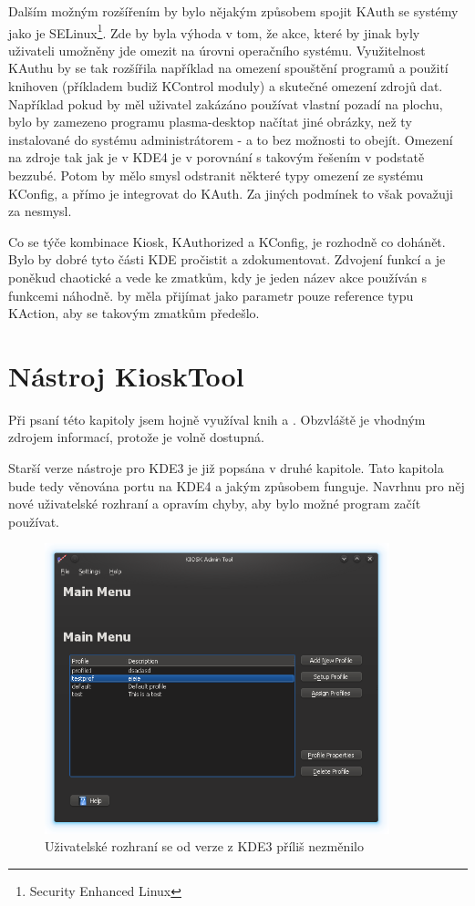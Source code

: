 Dalším možným rozšířením by bylo nějakým způsobem spojit KAuth se systémy jako je SELinux\footnote{Security Enhanced Linux}. Zde by byla výhoda v tom, že akce, které by jinak byly uživateli umožněny jde omezit na úrovni operačního systému. Využitelnost KAuthu by se tak rozšířila například na omezení spouštění programů a použití knihoven (příkladem budiž KControl moduly) a skutečné omezení zdrojů dat. Například pokud by měl uživatel zakázáno používat vlastní pozadí na plochu, bylo by zamezeno programu plasma-desktop načítat jiné obrázky, než ty instalované do systému administrátorem - a to bez možnosti to obejít. Omezení na zdroje tak jak je v KDE4 je v porovnání s takovým řešením v podstatě bezzubé. Potom by mělo smysl odstranit některé typy omezení ze systému KConfig, a přímo je integrovat do KAuth. Za jiných podmínek to však považuji za nesmysl.

Co se týče kombinace Kiosk, KAuthorized a KConfig, je rozhodně co dohánět. Bylo by dobré tyto části KDE pročistit a zdokumentovat. Zdvojení funkcí  a  je poněkud chaotické a vede ke zmatkům, kdy je jeden název akce používán s funkcemi náhodně.  by měla přijímat jako parametr pouze reference typu KAction, aby se takovým zmatkům předešlo.

\chapter{Nástroj KioskTool}
Při psaní této kapitoly jsem hojně využíval knih \cite{StarchQt4} a \cite{Ezust}. Obzvláště \cite{Ezust} je vhodným zdrojem informací, protože je volně dostupná.

Starší verze nástroje pro KDE3 je již popsána v druhé kapitole. Tato kapitola bude tedy věnována portu na KDE4 a jakým způsobem funguje. Navrhnu pro něj nové uživatelské rozhraní a opravím chyby, aby bylo možné program začít používat.

\begin{figure}[h]
    \centering
    \includegraphics[width=10cm]{obrazky/KioskToolKDE4/kiosktool_kde4.png}
    \caption{Uživatelské rozhraní se od verze z KDE3 příliš nezměnilo}
    \label{fig:kt4_uvod}
\end{figure}

